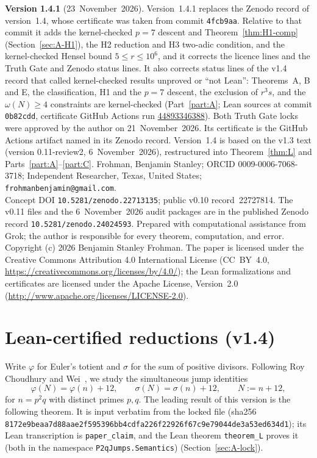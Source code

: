 \documentclass[11pt,reqno]{amsart}
\newcommand{\ph}{\varphi}
\newcommand{\sig}{\sigma}
\theoremstyle{definition}
\begin{document}
\vspace{-0.7em}
{\small\noindent
\textbf{Version 1.4.1} (23~November~2026). Version~1.4.1 replaces the Zenodo record of version~1.4, whose certificate was taken from commit \texttt{4fcb9aa}. Relative to that commit it adds the kernel-checked \(p=7\) descent and Theorem~\ref{thm:H1-comp} (Section~\ref{sec:A-H1}), the H2 reduction and H3 two-adic condition, and the kernel-checked Hensel bound \(5\le r\le 10^6\), and it corrects the licence lines and the Truth Gate and Zenodo status lines. It also corrects status lines of the v1.4 record that called kernel-checked results unproved or ``not Lean'': Theorems~A, B and E, the classification, H1 and the \(p=7\) descent, the exclusion of \(r^3s\), and the \(\omega(N)\ge 4\) constraints are kernel-checked (Part~\ref{part:A}; Lean sources at commit \texttt{0b82cdd}, certificate GitHub Actions run \href{https://github.com/BenFrohman/p2q-jumps-lean/actions/runs/44893346388}{44893346388}). Both Truth Gate locks were approved by the author on 21~November~2026. Its certificate is the GitHub Actions artifact named in its Zenodo record. Version~1.4 is based on the v1.3 text (version 0.11-review2, 6~November~2026), restructured into Theorem~\ref{thm:L} and Parts~\ref{part:A}--\ref{part:C}. Frohman, Benjamin Stanley; ORCID 0009-0006-7068-3718; Independent Researcher, Texas, United States; \texttt{frohmanbenjamin@gmail.com}.\\
Concept DOI \texttt{10.5281/zenodo.22713135}; public v0.10 record~22727814.
The v0.11 files and the 6~November~2026 audit packages are in the published Zenodo record \texttt{10.5281/zenodo.24024593}.
Prepared with computational assistance from Grok; the author is responsible for every theorem, computation, and error.
Copyright (c) 2026 Benjamin Stanley Frohman. The paper is licensed under the Creative Commons Attribution 4.0 International License (CC~BY~4.0, \url{https://creativecommons.org/licenses/by/4.0/}); the Lean formalizations and certificates are licensed under the Apache License, Version~2.0 (\url{http://www.apache.org/licenses/LICENSE-2.0}).}

\section{Lean-certified reductions (v1.4)}
\label{sec:v14-lean}

Write \(\ph\) for Euler's totient and \(\sig\) for the sum of positive divisors. Following Roy Choudhury and Wei~\cite{RCW2026}, we study the simultaneous jump identities
\begin{equation}
\label{eq:jumps}
\ph(N)=\ph(n)+12,\qquad \sig(N)=\sig(n)+12,\qquad N:=n+12,
\end{equation}
for \(n=p^2q\) with distinct primes \(p,q\). The leading result of this version is the following theorem. It is input verbatim from the locked file  (sha256 \texttt{8172e9beaa\allowbreak{}7d88aae2f5\allowbreak{}95396bb4cd\allowbreak{}fa226f2292\allowbreak{}6f67c9e790\allowbreak{}44de3a53ed\allowbreak{}634d1}); its Lean transcription is \texttt{paper\_claim}, and the Lean theorem \texttt{theorem\_L} proves it (both in the namespace \texttt{P2qJumps.Semantics}) (Section~\ref{sec:A-lock}).
\end{document}
